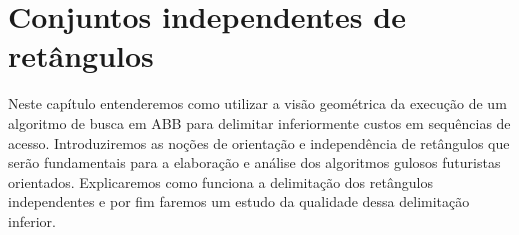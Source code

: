 
\chapter{Conjuntos independentes de retângulos}
\label{cap:retângulos-independentes}

\newcommand{\rectpos}{%
    \begin{tikzpicture}[baseline={(0,0)}, scale=0.2]
        \draw (0,0) rectangle (1.2,1.2); %
        \draw[thick] (0,0) -- (1.2,1.2); %
        \fill (0,0) circle (0.15); %
        \fill (1.2,1.2) circle (0.15); %
    \end{tikzpicture}%
}

\newcommand{\rectneg}{%
    \begin{tikzpicture}[baseline={(0,0)}, scale=0.2]
        \draw (0,0) rectangle (1.2,1.2); %
        \draw[thick] (0,1.2) -- (1.2,0); %
        \fill (0,1.2) circle (0.15); %
        \fill (1.2,0) circle (0.15); %
    \end{tikzpicture}%
}

\newcommand{\recttotal}{%
    \begin{tikzpicture}[baseline={(0,0)}, scale=0.2]
        \draw (0,0) rectangle (1.2,1.2); %
        \draw[thick] (0,1.2) -- (1.2,0); %
        \draw[thick] (0,0) -- (1.2,1.2); %
        \fill (0,1.2) circle (0.15); %
        \fill (1.2,0) circle (0.15); %
        \fill (0,0) circle (0.15); %
        \fill (1.2,1.2) circle (0.15); %
    \end{tikzpicture}%
}

Neste capítulo entenderemos como utilizar a visão geométrica da execução de um algoritmo de busca em ABB para delimitar inferiormente custos em sequências de acesso. Introduziremos as noções de orientação e independência de retângulos que serão fundamentais para a elaboração e análise dos algoritmos gulosos futuristas orientados. Explicaremos como funciona a delimitação dos retângulos independentes e por fim faremos um estudo da qualidade dessa delimitação inferior.

